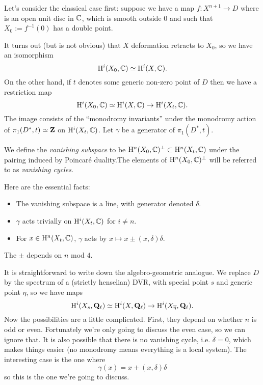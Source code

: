 Let's consider the classical case first: suppose we have a map $f \colon X^{n+1} \rightarrow D$ where is an open unit disc in $\mathbb{C}$, which is smooth outside $0$ and such that $X_0 := f^{-1}(0)$ has a double point. 

It turns out (but is not obvious) that $X$ deformation retracts to $X_0$, so we have an isomorphism 
\[
\mathrm{H}^i(X_0, \mathbb{C}) \simeq \mathrm{H}^i(X, \mathbb{C}).
\]
On the other hand, if $t$ denotes some generic non-zero point of $D$ then we have a restriction map 
\[
\mathrm{H}^i(X_0, \mathbb{C}) \simeq \mathrm{H}^i(X,\mathbb{C}) \rightarrow \mathrm{H}^i(X_t, \mathbb{C}).
\]
The image consists of the ``monodromy invariants'' under the monodromy action of $\pi_1(D^*, t) \simeq \mathbf{Z}$ on $\mathrm{H}^i(X_t, \mathbb{C})$. Let $\gamma$ be a generator of $\pi_1(D^*, t)$. 

\begin{defn}
We define the \emph{vanishing subspace} to be $\mathrm{H}^n(X_0, \mathbb{C})^{\perp} \subset \mathrm{H}^n(X_t, \mathbb{C})$ under the pairing induced by Poincar\'{e} duality.The elements of $\mathrm{H}^n(X_0, \mathbb{C})^{\perp} $ will be referred to as \emph{vanishing cycles}. 
\end{defn}

Here are the essential facts:
\begin{itemize}
\item The vanishing subspace is a line, with generator denoted $\delta$. 
\item $\gamma$ acts trivially on $\mathrm{H}^i(X_t, \mathbb{C})$ for $i \neq n$. 
\item For $x \in \mathrm{H}^n(X_t, \mathbb{C})$, $\gamma$ acts by $x \mapsto x \pm (x, \delta) \delta$. 
\end{itemize}

\begin{rem}
The $\pm$ depends on $n$ mod $4$.
\end{rem}


It is straightforward to write down the algebro-geometric analogue. We replace $D$ by the spectrum of a (strictly henselian) DVR, with special point $s$ and generic point $\eta$, so we have maps 
\[
\mathrm{H}^i(X_s, \mathbf{Q}_{\ell}) \simeq \mathrm{H}^i(X, \mathbf{Q}_{\ell}) \rightarrow \mathrm{H}^i(X_{\overline{\eta}}, \mathbf{Q}_{\ell}).
\]
Now the possibilities are a little complicated. First, they depend on whether $n$ is odd or even. Fortunately we're only going to discuss the even case, so we can ignore that. It is also possible that there is no vanishing cycle, i.e. $\delta=0$, which makes things easier (no monodromy means everything is a local system). The interesting case is the one where 
\begin{equation}\label{PL}
\gamma(x) = x + (x,\delta) \delta 
\end{equation}
so this is the one we're going to discuss. 

